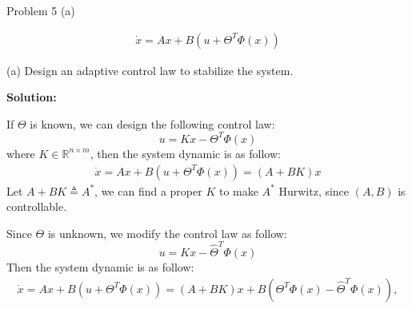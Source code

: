 \documentclass[8pt]{beamer}
\let\tempone\itemize
\let\temptwo\enditemize
\newenvironment{proitemize}{\vspace{-1em}\tempone}{\temptwo}%
\begin{document}
\begin{frame}[t]{Problem 5 (a)}
  \begin{block}{}
\begin{align*}
\dot x = A x +B(u+\Theta^T\Phi(x))
\end{align*}
\begin{proitemize}
  \item[(a)] Design an adaptive control law to stabilize the system.
\end{proitemize}
  \end{block}

\textbf{Solution:}

If $\Theta$ is known, we can design the following control law:
\begin{equation*}
  u = Kx-\Theta^T\Phi(x)
\end{equation*}
where $K \in \mathbb{R}^{n \times m}$, then the system dynamic is as follow:
\begin{align*}
    \dot x = Ax+B(u+\Theta^T\Phi(x))=(A+BK)x
\end{align*}
Let $A+BK \triangleq A^*$, we can find a proper $K$ to make $A^*$ Hurwitz, since $(A,B)$ is controllable. 

Since $\Theta$ is unknown, we modify the control law as follow:
\begin{equation*}
    u = Kx-\hat{\Theta}^T\Phi(x)
\end{equation*}
Then the system dynamic is as follow:
\begin{align*}
    \dot x = Ax+B(u+\Theta^T\Phi(x)) =(A+BK)x+B(\Theta^T\Phi(x)-\hat{\Theta}^T\Phi(x)), 
\end{align*}
\end{frame}
\end{document}
